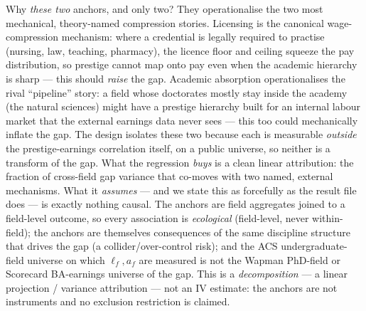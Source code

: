 \documentclass[11pt]{article}
\begin{document}
Why \emph{these two} anchors, and only two? They operationalise the two most mechanical, theory-named compression stories. Licensing is the canonical wage-compression mechanism: where a credential is legally required to practise (nursing, law, teaching, pharmacy), the licence floor and ceiling squeeze the pay distribution, so prestige cannot map onto pay even when the academic hierarchy is sharp --- this should \emph{raise} the gap. Academic absorption operationalises the rival ``pipeline'' story: a field whose doctorates mostly stay inside the academy (the natural sciences) might have a prestige hierarchy built for an internal labour market that the external earnings data never sees --- this too could mechanically inflate the gap. The design isolates these two because each is measurable \emph{outside} the prestige-earnings correlation itself, on a public universe, so neither is a transform of the gap. What the regression \emph{buys} is a clean linear attribution: the fraction of cross-field gap variance that co-moves with two named, external mechanisms. What it \emph{assumes} --- and we state this as forcefully as the result file does --- is exactly nothing causal. The anchors are field aggregates joined to a field-level outcome, so every association is \emph{ecological} (field-level, never within-field); the anchors are themselves consequences of the same discipline structure that drives the gap (a collider/over-control risk); and the ACS undergraduate-field universe on which $\ell_f, a_f$ are measured is not the Wapman PhD-field or Scorecard BA-earnings universe of the gap. This is a \emph{decomposition} --- a linear projection / variance attribution --- not an IV estimate: the anchors are not instruments and no exclusion restriction is claimed.
\end{document}
